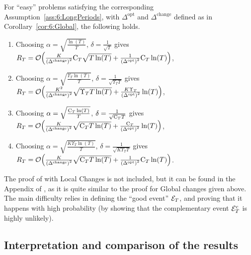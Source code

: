 \begin{corollary}\label{cor:6:Local}
    For ``easy'' problems satisfying the corresponding Assumption~\ref{ass:6:LongPeriods},
    with $\Delta^{\text{opt}}$ and ${\Delta}^{\text{change}}$ defined as in Corollary~\ref{cor:6:Global}, the following holds.
    \begin{enumerate}
        \item Choosing $\alpha = \sqrt{\frac{\ln(T)}{T}}$, $\delta = \frac{1}{\sqrt{T}}$ gives $R_T = \mathop{}\mathopen{}\mathcal{O}\mathopen{}\left(\frac{K}{\left({\Delta}^{\text{change}}\right)^2} \mathrm{C}_T\sqrt{T\ln(T)} + \frac{1}{\left(\Delta^{\text{opt}}\right)^2} \mathrm{C}_T\ln(T)\right)$,
        \item Choosing $\alpha = \sqrt{\frac{\Upsilon_T\ln(T)}{T}}$, $\delta = \frac{1}{\sqrt{\Upsilon_T T}}$ gives $R_T = \mathop{}\mathopen{}\mathcal{O}\mathopen{}\left(\frac{K^2}{\left({\Delta}^{\text{change}}\right)^2}\sqrt{\Upsilon_T T\ln(T)} + \frac{K\Upsilon_T}{\left(\Delta^{\text{opt}}\right)^2}\ln(T)\right)$,
        \item Choosing $\alpha = \sqrt{\frac{\mathrm{C}_T\ln(T)}{T}}$, $\delta = \frac{1}{\sqrt{\mathrm{C}_T T}}$ gives $R_T = \mathop{}\mathopen{}\mathcal{O}\mathopen{}\left(\frac{K}{\left({\Delta}^{\text{change}}\right)^2}\sqrt{\mathrm{C}_T T\ln(T)} + \frac{\mathrm{C}_T}{\left(\Delta^{\text{opt}}\right)^2}\ln(T)\right)$,
        \item Choosing $\alpha = \sqrt{\frac{K\Upsilon_T\ln(T)}{T}}$, $\delta = \frac{1}{\sqrt{K\Upsilon_T T}}$ gives $R_T = \mathop{}\mathopen{}\mathcal{O}\mathopen{}\left(\frac{K}{\left({\Delta}^{\text{change}}\right)^2}\sqrt{\mathrm{C}_T T\ln(T)} + \frac{1}{\left(\Delta^{\text{opt}}\right)^2} \mathrm{C}_T\ln(T)\right)$.
    \end{enumerate}
\end{corollary}

The proof of \GLRklUCB{} with Local Changes is not included, but it can be found in the Appendix of \cite{Besson2019GLRT}, as it is quite similar to the proof for Global changes given above. The main difficulty relies in defining the ``good event'' $\mathcal{E}_T$, and proving that it happens with high probability (by showing that the complementary event $\mathcal{E}_T^c$ is highly unlikely).


\subsection{Interpretation and comparison of the results}
\label{sub:6:interpretationRegretBounds}

